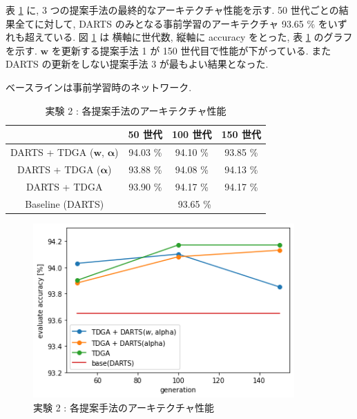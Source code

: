 表 \ref{tab:acc_ga} に, 3 つの提案手法の最終的なアーキテクチャ性能を示す.
50 世代ごとの結果全てに対して, DARTS のみとなる事前学習のアーキテクチャ 93.65 \% をいずれも超えている.
図 \ref{fig:exp2/eval} は 横軸に世代数, 縦軸に accuracy をとった,
表 \ref{tab:acc_ga} のグラフを示す.
$\bm{w}$ を更新する提案手法 1 が 150 世代目で性能が下がっている.
また DARTS の更新をしない提案手法 3 が最もよい結果となった.


\begin{table}[t]
  \begin{center}
    \caption{実験 2 : 各提案手法のアーキテクチャ性能}
		\vspace{-1mm}
    ベースラインは事前学習時のネットワーク.
		\vspace{1mm}
		\vspace{3mm}
    \begin{tabular}{|c|c|c|c|} \hline
    \textbf{}       & \textbf{50 世代} & \textbf{100 世代} & \textbf{150 世代} \\ \hline\hline
    DARTS + TDGA ($\bm{w}$, $\bm{\alpha}$)& 94.03 \%       & 94.10 \%        & 93.85 \%        \\ \hline
    DARTS + TDGA ($\bm{\alpha}$)& 93.88 \%       & 94.08 \%        & 94.13 \%        \\ \hline
    DARTS + TDGA   & 93.90 \%       & 94.17 \%        & 94.17 \%        \\ \hline
    Baseline (DARTS) & \multicolumn{3}{c|}{93.65 \%}                      \\ \hline
    \end{tabular}
    \label{tab:acc_ga}
  \end{center}
\end{table}

\begin{figure}[t]
  \begin{center}
    \includegraphics[clip,width=10cm]{./fig/04.exp/eval.png}
  \end{center}
  \caption{実験 2 : 各提案手法のアーキテクチャ性能}
  \label{fig:exp2/eval}
\end{figure}


